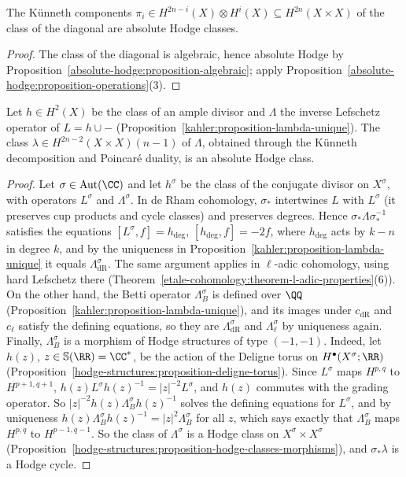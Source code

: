 \begin{corollary}\label{absolute-hodge:corollary-kunneth}
The K\"unneth components $\pi_i \in H^{2n-i}(X) \otimes H^i(X) \subseteq H^{2n}(X \times X)$ of the class of the diagonal are absolute Hodge classes.
\end{corollary}

\begin{proof}
The class of the diagonal is algebraic, hence absolute Hodge by Proposition~\ref{absolute-hodge:proposition-algebraic}; apply Proposition~\ref{absolute-hodge:proposition-operations}(3).
\end{proof}

\begin{corollary}\label{absolute-hodge:corollary-lambda}
Let $h \in H^2(X)$ be the class of an ample divisor and $\Lambda$ the inverse Lefschetz operator of $L = h \cup -$ (Proposition~\ref{kahler:proposition-lambda-unique}). The class
$\lambda \in H^{2n-2}(X \times X)(n-1)$ of $\Lambda$, obtained through the K\"unneth decomposition and Poincar\'e duality, is an absolute Hodge class.
\end{corollary}

\begin{proof}
Let $\sigma \in \mathrm{Aut}(\CC)$ and let $h^\sigma$ be the class of the conjugate divisor on $X^\sigma$, with operators $L^\sigma$ and $\Lambda^\sigma$. In de Rham cohomology, $\sigma_*$ intertwines $L$ with $L^\sigma$ (it
preserves cup products and cycle classes) and preserves degrees. Hence $\sigma_*\Lambda\sigma_*^{-1}$ satisfies the equations $[L^\sigma, f] = h_{\deg}$, $[h_{\deg}, f] = -2f$, where $h_{\deg}$ acts by $k - n$ in degree $k$,
and by the uniqueness in Proposition~\ref{kahler:proposition-lambda-unique} it equals $\Lambda^\sigma_{\mathrm{dR}}$. The same argument applies in $\ell$-adic cohomology, using hard Lefschetz there
(Theorem~\ref{etale-cohomology:theorem-l-adic-properties}(6)). On the other hand, the Betti operator $\Lambda^\sigma_B$ is defined over $\QQ$ (Proposition~\ref{kahler:proposition-lambda-unique}),
and its images under $c_{\mathrm{dR}}$ and $c_\ell$ satisfy the defining equations, so they are $\Lambda^\sigma_{\mathrm{dR}}$ and $\Lambda^\sigma_\ell$ by uniqueness again. Finally, $\Lambda^\sigma_B$ is a morphism of Hodge
structures of type $(-1,-1)$. Indeed, let $h(z)$, $z \in \mathbb{S}(\RR) = \CC^*$, be the action of the Deligne torus on $H^\bullet(X^\sigma; \RR)$ (Proposition~\ref{hodge-structures:proposition-deligne-torus}). Since
$L^\sigma$ maps $H^{p,q}$ to $H^{p+1,q+1}$, $h(z)L^\sigma h(z)^{-1} = |z|^{-2}L^\sigma$, and $h(z)$ commutes with the grading operator. So $|z|^{-2}h(z)\Lambda^\sigma_Bh(z)^{-1}$ solves the defining equations for
$L^\sigma$, and by uniqueness $h(z)\Lambda^\sigma_Bh(z)^{-1} = |z|^2\Lambda^\sigma_B$ for all $z$, which says exactly that $\Lambda^\sigma_B$ maps $H^{p,q}$ to $H^{p-1,q-1}$. So the class of $\Lambda^\sigma$ is a Hodge class on $X^\sigma \times X^\sigma$
(Proposition~\ref{hodge-structures:proposition-hodge-classes-morphisms}), and $\sigma_*\lambda$ is a Hodge cycle.
\end{proof}

